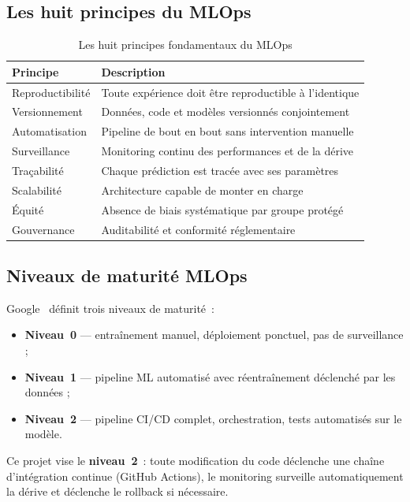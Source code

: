 \subsection{Les huit principes du MLOps}

\begin{table}[htbp]
\centering
\caption{Les huit principes fondamentaux du MLOps}
\label{tab:principes_mlops}
\begin{tabularx}{\textwidth}{@{}lX@{}}
\toprule
\textbf{Principe} & \textbf{Description} \\
\midrule
Reproductibilité & Toute expérience doit être reproductible à l'identique \\
Versionnement    & Données, code et modèles versionnés conjointement \\
Automatisation   & Pipeline de bout en bout sans intervention manuelle \\
Surveillance     & Monitoring continu des performances et de la dérive \\
Traçabilité      & Chaque prédiction est tracée avec ses paramètres \\
Scalabilité      & Architecture capable de monter en charge \\
Équité           & Absence de biais systématique par groupe protégé \\
Gouvernance      & Auditabilité et conformité réglementaire \\
\bottomrule
\end{tabularx}
\end{table}

\subsection{Niveaux de maturité MLOps}

Google~\cite{sculley2015hidden} définit trois niveaux de maturité~:
\begin{itemize}
  \item \textbf{Niveau~0} — entraînement manuel, déploiement ponctuel, pas de
        surveillance ;
  \item \textbf{Niveau~1} — pipeline ML automatisé avec réentraînement déclenché
        par les données ;
  \item \textbf{Niveau~2} — pipeline CI/CD complet, orchestration, tests
        automatisés sur le modèle.
\end{itemize}

\noindent Ce projet vise le \textbf{niveau~2}~: toute modification du code déclenche
une chaîne d'intégration continue (GitHub Actions), le monitoring surveille
automatiquement la dérive et déclenche le rollback si nécessaire.

